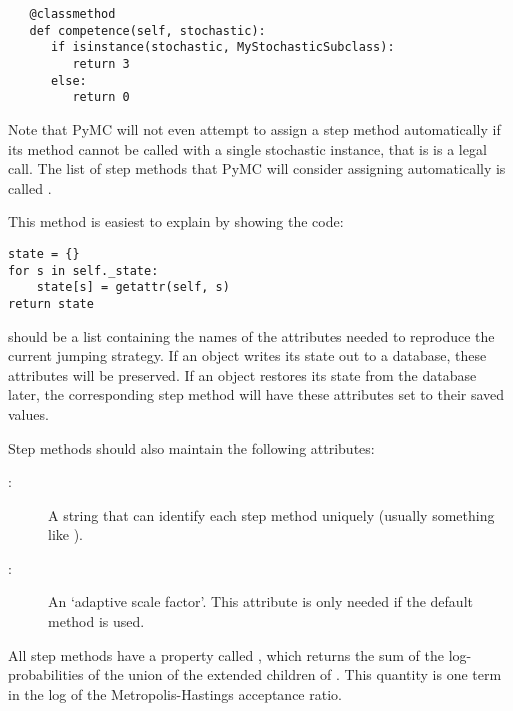 \begin{description}
\begin{verbatim}
   @classmethod
   def competence(self, stochastic):
      if isinstance(stochastic, MyStochasticSubclass):
         return 3
      else:
         return 0
\end{verbatim}
   Note that PyMC will not even attempt to assign a step method automatically if its  method cannot be called with a single stochastic instance, that is  is a legal call. The list of step methods that PyMC will consider assigning automatically is called .
   \item[\code{current_state()}:] This method is easiest to explain by showing the code:
   \begin{verbatim}
state = {}
for s in self._state:
    state[s] = getattr(self, s)
return state      
   \end{verbatim}
    should be a list containing the names of the attributes needed to reproduce the current jumping strategy. If an  object writes its state out to a database, these attributes will be preserved. If an  object restores its state from the database later, the corresponding step method will have these attributes set to their saved values.
\end{description}

Step methods should also maintain the following attributes:
\begin{description}
   \item[:] A string that can identify each step method uniquely (usually something like ).
   \item[:] An `adaptive scale factor'. This attribute is only needed if the default  method is used.
\end{description}

All step methods have a property called , which returns the sum of the log-probabilities of the union of the extended children of . This quantity is one term in the log of the Metropolis-Hastings acceptance ratio.


\hypertarget{user-metro}{}
